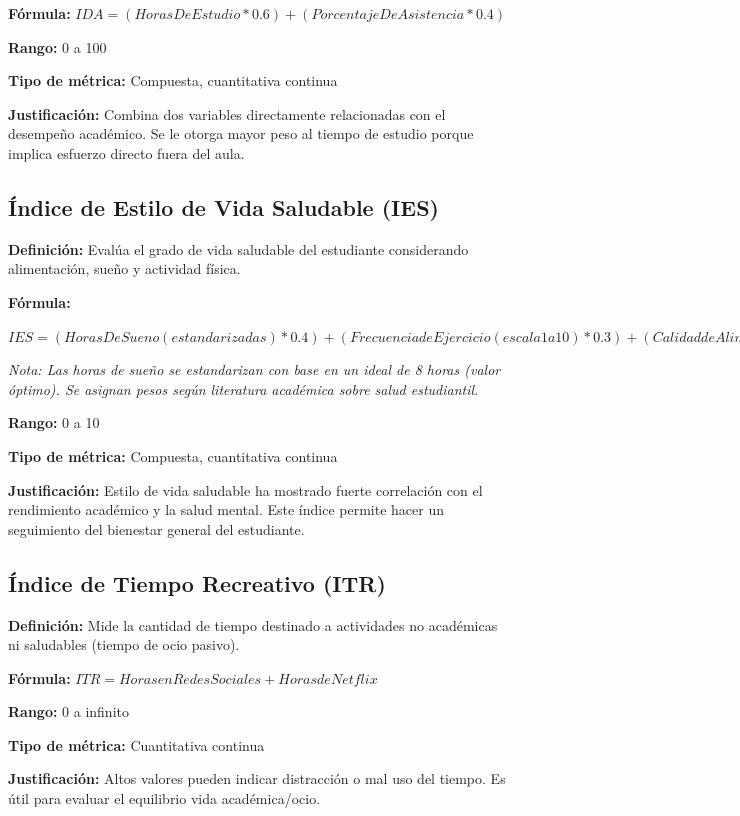 \documentclass[12pt,letterpaper]{report}
\begin{document}
\textbf{Fórmula:}
\(IDA = (Horas De Estudio * 0.6) + (Porcentaje De Asistencia * 0.4)\)

\textbf{Rango:} 0 a 100

\textbf{Tipo de métrica:} Compuesta, cuantitativa continua

\textbf{Justificación:} Combina dos variables directamente relacionadas con el desempeño académico. Se le otorga mayor peso al tiempo de estudio porque implica esfuerzo directo fuera del aula.


\subsection{Índice de Estilo de Vida Saludable (IES)}

\textbf{Definición: }Evalúa el grado de vida saludable del estudiante considerando alimentación, sueño y actividad física.

\textbf{Fórmula:}

\(IES = (Horas De Sueno (estandarizadas) * 0.4) + 
(Frecuencia de Ejercicio (escala 1 a 10) * 0.3) + 
(Calidad de Alimentacion (escala 1 a 10) * 0.3)
\)

\textit{Nota: Las horas de sueño se estandarizan con base en un ideal de 8 horas (valor óptimo). Se asignan pesos según literatura académica sobre salud estudiantil.}

\textbf{Rango:} 0 a 10

\textbf{Tipo de métrica: }Compuesta, cuantitativa continua

\textbf{Justificación: }Estilo de vida saludable ha mostrado fuerte correlación con el rendimiento académico y la salud mental. Este índice permite hacer un seguimiento del bienestar general del estudiante.


\subsection{Índice de Tiempo Recreativo (ITR)}

\textbf{Definición: }Mide la cantidad de tiempo destinado a actividades no académicas ni saludables (tiempo de ocio pasivo).

\textbf{Fórmula:}
\(ITR = Horas en Redes Sociales + Horas de Netflix\)

\textbf{Rango:} 0 a infinito

\textbf{Tipo de métrica:} Cuantitativa continua

\textbf{Justificación:} Altos valores pueden indicar distracción o mal uso del tiempo. Es útil para evaluar el equilibrio vida académica/ocio.
\end{document}
